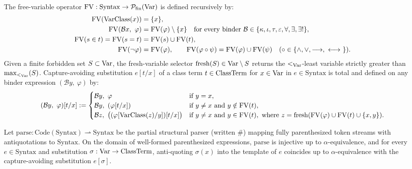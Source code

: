 \begin{definition}
\label{def:free_vars_and_substitution}
The free-variable operator $\mathrm{FV} : \mathrm{Syntax} \to \mathcal{P}_{\mathrm{fin}}(\mathrm{Var})$ is defined recursively by:
\begin{align*}
\mathrm{FV}(\mathrm{VarClass}(x)) &= \{x\}, \\
\mathrm{FV}(\mathcal{B} x,\ \varphi) &= \mathrm{FV}(\varphi) \setminus \{x\} \quad \text{for every binder } \mathcal{B} \in \{\kappa, \iota, \tau, \varepsilon, \forall, \exists, \exists!\}, \\
\mathrm{FV}(s \in t) = \mathrm{FV}(s = t) &= \mathrm{FV}(s) \cup \mathrm{FV}(t), \\
\mathrm{FV}(\lnot \varphi) &= \mathrm{FV}(\varphi), \qquad \mathrm{FV}(\varphi \circ \psi) = \mathrm{FV}(\varphi) \cup \mathrm{FV}(\psi) \quad (\circ \in \{\land, \lor, \longrightarrow, {\ \longleftrightarrow\ }\}).
\end{align*}
Given a finite forbidden set $S \subset \mathrm{Var}$, the fresh-variable selector $\mathrm{fresh}(S) \in \mathrm{Var} \setminus S$ returns the $<_{\mathrm{Var}}$-least variable strictly greater than $\max_{<_{\mathrm{Var}}}(S)$. Capture-avoiding substitution $e[t/x]$ of a class term $t \in {\text{ClassTerm}}$ for $x \in \mathrm{Var}$ in $e \in \mathrm{Syntax}$ is total and defined on any binder expression $(\mathcal{B} y,\ \varphi)$ by:
\[
(\mathcal{B} y,\ \varphi)[t/x] :=
\begin{cases}
\mathcal{B} y,\ \varphi & \text{if } y = x, \\
\mathcal{B} y,\ (\varphi[t/x]) & \text{if } y \ne x \text{ and } y \notin \mathrm{FV}(t), \\
\mathcal{B} z,\ \big((\varphi[\mathrm{VarClass}(z)/y])[t/x]\big) & \text{if } y \ne x \text{ and } y \in \mathrm{FV}(t),\ \text{where } z = \mathrm{fresh}(\mathrm{FV}(\varphi) \cup \mathrm{FV}(t) \cup \{x, y\}).
\end{cases}
\]
\end{definition}

\begin{theorem}
\label{thm:structural_encoding_unambiguous}
Let $\mathrm{parse} : \mathrm{Code}(\mathrm{Syntax}) \rightharpoonup \mathrm{Syntax}$ be the partial structural parser (written $\#$) mapping fully parenthesized token streams with antiquotations to $\mathrm{Syntax}$. On the domain of well-formed parenthesized expressions, $\mathrm{parse}$ is injective up to $\alpha$-equivalence, and for every $e \in \mathrm{Syntax}$ and substitution $\sigma : \mathrm{Var} \to {\text{ClassTerm}}$, anti-quoting $\sigma(x)$ into the template of $e$ coincides up to $\alpha$-equivalence with the capture-avoiding substitution $e[\sigma]$.
\end{theorem}

